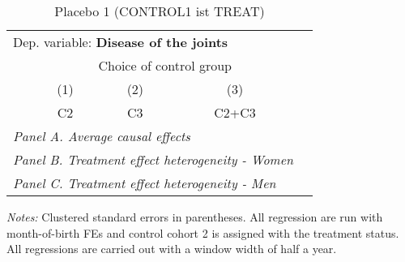  \begin{table}[H] \centering \begin{threeparttable} \caption{Placebo 1 (CONTROL1 ist TREAT) } {\def\sym#1{\ifmmode^{#1}\else\(^{#1}\)\fi} \begin{tabular}{l*{4}{c}} \toprule \multicolumn{4}{l}{Dep. variable: \textbf{Disease of the joints}} \\ & \multicolumn{3}{c}{Choice of control group} \\ \cmidrule(lr){2-4}
            &\multicolumn{1}{c}{(1)}&\multicolumn{1}{c}{(2)}&\multicolumn{1}{c}{(3)}\\
            &\multicolumn{1}{c}{C2}&\multicolumn{1}{c}{C3}&\multicolumn{1}{c}{C2+C3}\\
\midrule
 \multicolumn{4}{l}{\emph{Panel A. Average causal effects}} \\      \midrule\multicolumn{4}{l}{\emph{Panel B. Treatment effect heterogeneity - Women}} \\      \midrule\multicolumn{4}{l}{\emph{Panel C. Treatment effect heterogeneity - Men}} \\      
\bottomrule \end{tabular} } \begin{tablenotes} \item \scriptsize \emph{Notes:} Clustered standard errors in parentheses. All regression are run with month-of-birth FEs and control cohort 2 is assigned with the treatment status. All regressions are carried out with a window width of half a year. \end{tablenotes} \end{threeparttable} \end{table} 
